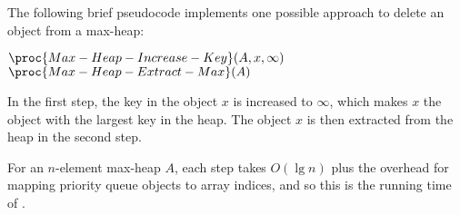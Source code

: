 The following brief pseudocode implements one possible approach to delete an object from a max-heap:

\begin{codebox}
\li $\proc{Max-Heap-Increase-Key}(A,x,\infty)$
\li $\proc{Max-Heap-Extract-Max}(A)$
\end{codebox}

In the first step, the key in the object $x$ is increased to $\infty$, which makes $x$ the object with the largest key in the heap.
The object $x$ is then extracted from the heap in the second step.

For an $n$-element max-heap $A$, each step takes $O(\lg n)$ plus the overhead for mapping priority queue objects to array indices, and so this is the running time of .
